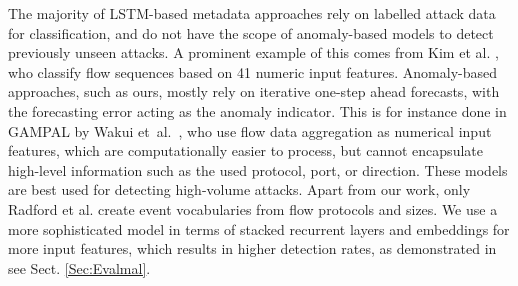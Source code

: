 The majority of LSTM-based metadata approaches rely on labelled attack data for classification, and do not have the scope of anomaly-based models to detect previously unseen attacks. %
A prominent example of this comes from Kim et al. \cite{kim2016long}, who classify flow sequences based on 41 numeric input features. %
Anomaly-based approaches, such as ours, mostly rely on iterative one-step ahead forecasts, with the forecasting error acting as the anomaly indicator. This is for instance done in GAMPAL by Wakui et~al.~\cite{wakui2019gampal}, who use flow data aggregation  as numerical input features, which are computationally easier to process, but cannot encapsulate high-level information such as the used protocol, port, or direction. These models are best used for detecting high-volume attacks.
Apart from our work, only Radford et al. \cite{radford2018network} create event vocabularies from flow protocols and sizes. We use a more sophisticated model in terms of stacked recurrent layers and embeddings for more input features, which results in higher detection rates, as demonstrated in see Sect. \ref{Sec:Evalmal}.


